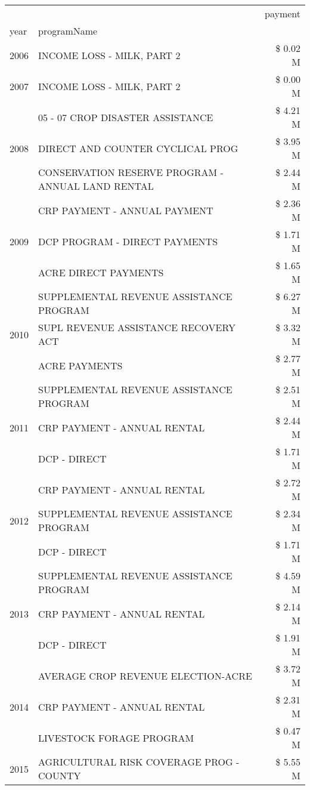 \begin{tabular}{llr}
\toprule
 &  & payment \\
year & programName &  \\
\midrule
2006 & INCOME LOSS - MILK, PART 2 & \$ 0.02 M \\
\cline{1-3}
2007 & INCOME LOSS - MILK, PART 2 & \$ 0.00 M \\
\cline{1-3}
\multirow[t]{3}{*}{2008} & 05 - 07 CROP DISASTER ASSISTANCE & \$ 4.21 M \\
 & DIRECT AND COUNTER CYCLICAL PROG & \$ 3.95 M \\
 & CONSERVATION RESERVE PROGRAM - ANNUAL LAND RENTAL & \$ 2.44 M \\
\cline{1-3}
\multirow[t]{3}{*}{2009} & CRP PAYMENT - ANNUAL PAYMENT & \$ 2.36 M \\
 & DCP PROGRAM - DIRECT PAYMENTS & \$ 1.71 M \\
 & ACRE DIRECT PAYMENTS & \$ 1.65 M \\
\cline{1-3}
\multirow[t]{3}{*}{2010} & SUPPLEMENTAL REVENUE ASSISTANCE PROGRAM & \$ 6.27 M \\
 & SUPL REVENUE ASSISTANCE RECOVERY ACT & \$ 3.32 M \\
 & ACRE PAYMENTS & \$ 2.77 M \\
\cline{1-3}
\multirow[t]{3}{*}{2011} & SUPPLEMENTAL REVENUE ASSISTANCE PROGRAM & \$ 2.51 M \\
 & CRP PAYMENT - ANNUAL RENTAL & \$ 2.44 M \\
 & DCP - DIRECT & \$ 1.71 M \\
\cline{1-3}
\multirow[t]{3}{*}{2012} & CRP PAYMENT - ANNUAL RENTAL & \$ 2.72 M \\
 & SUPPLEMENTAL REVENUE ASSISTANCE PROGRAM & \$ 2.34 M \\
 & DCP - DIRECT & \$ 1.71 M \\
\cline{1-3}
\multirow[t]{3}{*}{2013} & SUPPLEMENTAL REVENUE ASSISTANCE PROGRAM & \$ 4.59 M \\
 & CRP PAYMENT - ANNUAL RENTAL & \$ 2.14 M \\
 & DCP - DIRECT & \$ 1.91 M \\
\cline{1-3}
\multirow[t]{3}{*}{2014} & AVERAGE CROP REVENUE ELECTION-ACRE & \$ 3.72 M \\
 & CRP PAYMENT - ANNUAL RENTAL & \$ 2.31 M \\
 & LIVESTOCK FORAGE PROGRAM & \$ 0.47 M \\
\cline{1-3}
\multirow[t]{3}{*}{2015} & AGRICULTURAL RISK COVERAGE PROG - COUNTY & \$ 5.55 M \\

\end{tabular}
